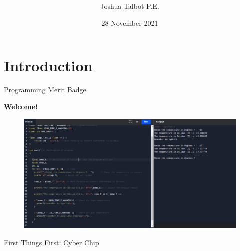 \documentclass[10pt]{beamer}
\title[Programming Merit Badge]{ }
\author{Joshua Talbot P.E.}
\institute{}
\date{28 November 2021}
\begin{document}

\section{Introduction}

{\1%

\begin{frame}{Programming Merit Badge}{ }
\begin{center}
\begin{block}{}
\center \textbf{Welcome!}
\end{block}
\vspace{0.5cm}
\begin{figure}%
\includegraphics[width=\textwidth]{img/C_code.png}
\end{figure}
\end{center}
\end{frame}


\begin{frame}{First Things First: Cyber Chip}{ }  
\begin{center}
\end{center}
\vskip 0.5cm


\end{frame}}
\end{document}
